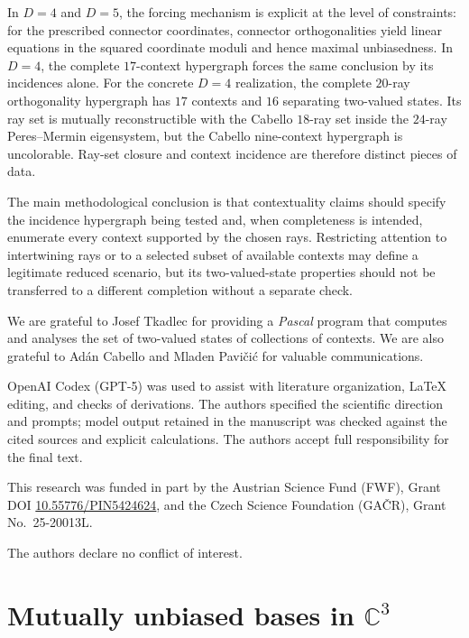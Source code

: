 \documentclass[%
  reprint,
  superscriptaddress,
  showkeys,
  amsmath,amssymb,
  aps,pra,
  longbibliography,
  floatfix,
  x11names
]{revtex4-2}
\begin{document}
In $D=4$ and $D=5$, the forcing mechanism is explicit at the level of constraints: for the prescribed connector coordinates, connector orthogonalities yield linear equations in the squared coordinate moduli and hence maximal unbiasedness.  In $D=4$, the complete $17$-context hypergraph forces the same conclusion by its incidences alone.  For the concrete $D=4$ realization, the complete $20$-ray orthogonality hypergraph has $17$ contexts and $16$ separating two-valued states.  Its ray set is mutually reconstructible with the Cabello $18$-ray set inside the $24$-ray Peres--Mermin eigensystem, but the Cabello nine-context hypergraph is uncolorable.  Ray-set closure and context incidence are therefore distinct pieces of data.

The main methodological conclusion is that contextuality claims should specify the incidence hypergraph being tested and, when completeness is intended, enumerate every context supported by the chosen rays.  Restricting attention to intertwining rays or to a selected subset of available contexts may define a legitimate reduced scenario, but its two-valued-state properties should not be transferred to a different completion without a separate check.

\begin{acknowledgments}
We are grateful to Josef Tkadlec for providing a {\em Pascal} program that computes and analyses the set of two-valued states of collections of contexts.
We are also grateful to Ad\'{a}n Cabello and Mladen Pavi{\v{c}}i{\'{c}} for valuable communications.

OpenAI Codex (GPT-5) was used to assist with literature organization, \LaTeX{}
editing, and checks of derivations.  The authors
specified the scientific
direction and prompts; model output retained in the manuscript was checked
against the cited sources and explicit calculations.  The authors accept
full
responsibility for the final text.

This research was funded in part by the Austrian
Science Fund (FWF), Grant DOI \href{https://doi.org/10.55776/PIN5424624}{10.55776/PIN5424624},
and the Czech Science
Foundation (GA\v{C}R), Grant No.~25-20013L.

The authors declare no conflict of interest.
\end{acknowledgments}



\appendix

\section{Mutually unbiased bases in \texorpdfstring{$\mathbb{C}^3$}{C\textasciicircum 3}}
\label{appendix:MUBsD3}
\end{document}

